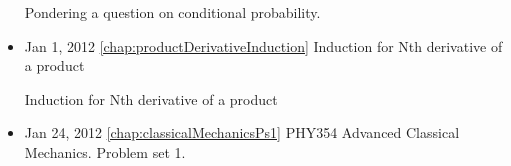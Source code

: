 \begin{itemize}
Pondering a question on conditional probability.\item Jan 1, 2012 \ref{chap:productDerivativeInduction} Induction for Nth derivative of a product

Induction for Nth derivative of a product\item Jan 24, 2012 \ref{chap:classicalMechanicsPs1} PHY354 Advanced Classical Mechanics.  Problem set 1.

\end{itemize}
